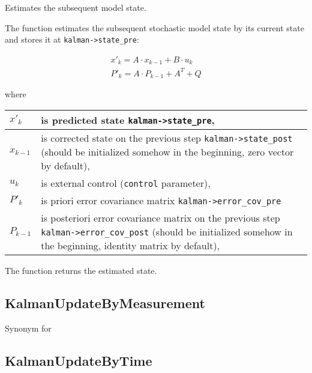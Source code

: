 Estimates the subsequent model state.


\begin{description}
\ifC
{}
\else
{}
\fi
{}
\end{description}

The function estimates the subsequent stochastic model state by its current state and stores it at \texttt{kalman->state\_pre}:

\[
\begin{array}{l}
x'_k=A \cdot x_{k-1}+B \cdot u_k\\
P'_k=A \cdot P_{k-1}+A^T + Q
\end{array}
\]

where

\begin{tabular}{l p{5 in}}
\hline
$x'_k$ & is predicted state \texttt{kalman->state\_pre},\\ \hline
$x_{k-1}$ & is corrected state on the previous step \texttt{kalman->state\_post}
                (should be initialized somehow in the beginning, zero vector by default),\\ \hline
$u_k$ & is external control (\texttt{control} parameter),\\ \hline
$P'_k$ & is priori error covariance matrix \texttt{kalman->error\_cov\_pre}\\ \hline
$P_{k-1}$ & is posteriori error covariance matrix on the previous step \texttt{kalman->error\_cov\_post}
                (should be initialized somehow in the beginning, identity matrix by default),
\end{tabular}

The function returns the estimated state.

\subsection{KalmanUpdateByMeasurement}

Synonym for 

\subsection{KalmanUpdateByTime}

